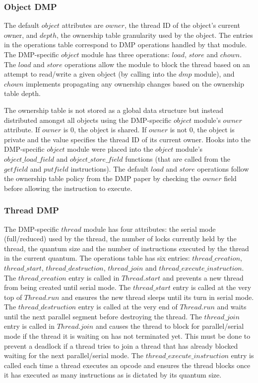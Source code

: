 \subsubsection{Object DMP}

The default $object$ attributes are $owner$, the thread ID of the
object's current owner, and $depth$, the ownership table granularity
used by the object.  The entries in the operations table correspond to
DMP operations handled by that module.  The DMP-specific $object$
module has three operations: $load$, $store$ and $chown$.  The $load$
and $store$ operations allow the module to block the thread based on
an attempt to read/write a given object (by calling into the $dmp$
module), and $chown$ implements propagating any ownership changes
based on the ownership table depth.

The ownership table is not stored as a global data structure but
instead distributed amongst all objects using the DMP-specific
$object$ module's $owner$ attribute.  If $owner$ is $0$, the object is
shared.  If $owner$ is not $0$, the object is private and the value
specifies the thread ID of its current owner.  Hooks into the
DMP-specific $object$ module were placed into the $object$ module's
$object\_load\_field$ and $object\_store\_field$ functions (that are
called from the $getfield$ and $putfield$ instructions).  The default
$load$ and $store$ operations follow the ownership table policy from
the DMP paper by checking the $owner$ field before allowing the
instruction to execute.

\subsubsection{Thread DMP}

The DMP-specific $thread$ module has four attributes: the serial mode
(full/reduced) used by the thread, the number of locks currently held
by the thread, the quantum size and the number of instructions
executed by the thread in the current quantum.  The operations table
has six entries: $thread\_creation$, $thread\_start$,
$thread\_destruction$, $thread\_join$ and
$thread\_execute\_instruction$.  The $thread\_creation$ entry is
called in $Thread.start$ and prevents a new thread from being created
until serial mode.  The $thread\_start$ entry is called at the very
top of $Thread.run$ and ensures the new thread sleeps until its turn
in serial mode.  The $thread\_destruction$ entry is called at the very
end of $Thread.run$ and waits until the next parallel segment before
destroying the thread.  The $thread\_join$ entry is called in
$Thread.join$ and causes the thread to block for parallel/serial mode
if the thread it is waiting on has not terminated yet.  This must be
done to prevent a deadlock if a thread tries to join a thread that has
already blocked waiting for the next parallel/serial mode.  The
$thread\_execute\_instruction$ entry is called each time a thread
executes an opcode and ensures the thread blocks once it has executed
as many instructions as is dictated by its quantum size.

